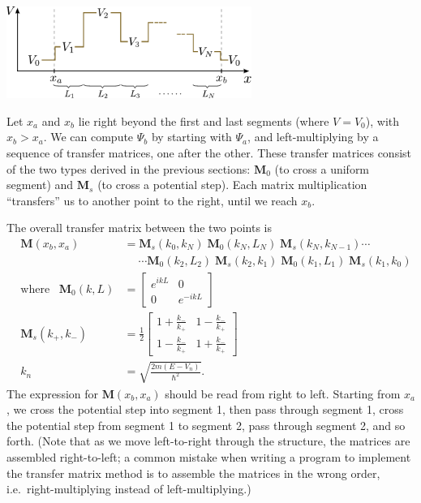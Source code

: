 \documentclass[prx,12pt]{revtex4-2}
\begin{document}
\begin{center}
  \includegraphics[width=0.6\textwidth]{transfer_matrix_setup2}
\end{center}

\noindent
Let $x_a$ and $x_b$ lie right beyond the first and last segments
(where $V = V_0$), with $x_b > x_a$.  We can compute $\Psi_b$ by
starting with $\Psi_a$, and left-multiplying by a sequence of transfer
matrices, one after the other.  These transfer matrices consist of the
two types derived in the previous sections: $\mathbf{M}_0$ (to cross a
uniform segment) and $\mathbf{M}_s$ (to cross a potential step).  Each
matrix multiplication ``transfers'' us to another point to the right,
until we reach $x_b$.

The overall transfer matrix between the two points is
\begin{equation}
  \boxed{\;\;\;\begin{aligned}\mathbf{M}(x_b, x_a) &= \mathbf{M}_s(k_0,k_N)\; \mathbf{M}_0(k_N,L_N) \; \mathbf{M}_s(k_N, k_{N-1}) \cdots \\ & \quad\;\cdots \mathbf{M}_0(k_2,L_2) \; \mathbf{M}_s(k_2, k_1) \; \mathbf{M}_0(k_1,L_1) \; \mathbf{M}_s(k_1,k_0) \;\;\;\\ \mathrm{where}\;\;\; \mathbf{M}_0(k,L) &= \begin{bmatrix}e^{ikL} & 0 \\ 0 & e^{-ikL}\end{bmatrix} \\ \mathbf{M}_s(k_+,k_-) &= \frac{1}{2} \begin{bmatrix}1+\frac{k_-}{k_+} & 1-\frac{k_-}{k_+} \\ 1-\frac{k_-}{k_+} & 1+\frac{k_-}{k_+}\end{bmatrix}\\ k_n &= \sqrt{\frac{2m(E-V_n)}{\hbar^2}}.\end{aligned}}
\end{equation}
The expression for $\mathbf{M}(x_b,x_a)$ should be read from right to
left.  Starting from $x_a$, we cross the potential step into segment
1, then pass through segment 1, cross the potential step from segment
1 to segment 2, pass through segment 2, and so forth.  (Note that as
we move left-to-right through the structure, the matrices are
assembled right-to-left; a common mistake when writing a program to
implement the transfer matrix method is to assemble the matrices in
the wrong order, i.e.~right-multiplying instead of left-multiplying.)
\end{document}
